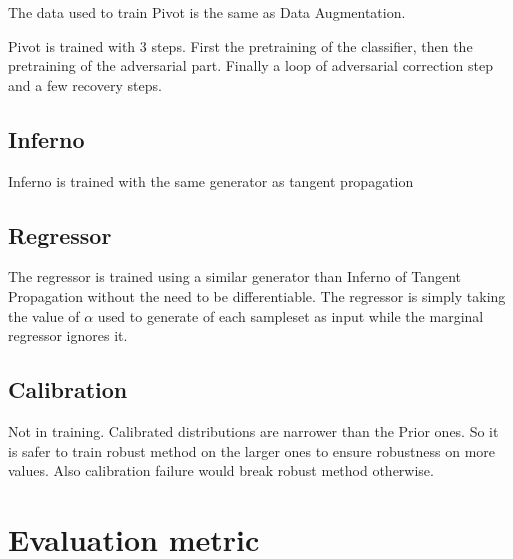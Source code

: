 The data used to train Pivot is the same as Data Augmentation.

Pivot is trained with 3 steps.
First the pretraining of the classifier, then the pretraining of the adversarial part.
Finally a loop of adversarial correction step and a few recovery steps.








\subsection{Inferno} %
\label{sub:inferno}

Inferno is trained with the same generator as tangent propagation




\subsection{Regressor} %
\label{sub:regressor}

The regressor is trained using a similar generator than Inferno of Tangent Propagation without the need to be differentiable.
The regressor is simply taking the value of $\alpha$ used to generate of each sampleset as input while the marginal regressor ignores it.









\subsection{Calibration} %
\label{sub:calibration}


Not in training.
Calibrated distributions are narrower than the Prior ones.
So it is safer to train robust method on the larger ones to ensure robustness on more values.
Also calibration failure would break robust method otherwise. 





















\section{Evaluation metric} %
\label{sec:evaluation_metric}

